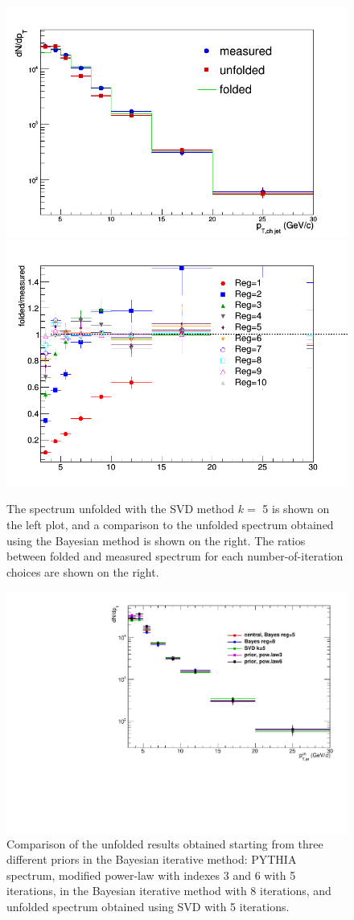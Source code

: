 \begin{figure}[bth]
\centering
\includegraphics[width=.45\textwidth]{pPbplots/unfolding/PythiaRM__Djet5Excl_SVD5_weight_UnfSpectrum}
\includegraphics[width=.45\textwidth]{pPbplots/unfolding/PythiaRM__Djet5Excl_SVD5_weight_foldedRatio}
\caption{The spectrum unfolded with the SVD method $k=$ 5 is shown on the left plot, and a comparison to the unfolded spectrum obtained using the Bayesian method is shown on the right.
The ratios between folded and measured spectrum for each number-of-iteration choices are shown on the right.}
\label{fig:unfSVDReg_pPb}
\end{figure}


\begin{figure}[bth]
\centering
\includegraphics[width=.45\textwidth]{pPbplots/unfolding/jetSpectra_unfSys}
\caption{Comparison of the unfolded results obtained starting from three different priors in the Bayesian iterative method: PYTHIA spectrum, modified power-law with indexes $3$ and $6$ with 5 iterations, in the Bayesian iterative method with 8 iterations, and unfolded spectrum obtained using SVD with 5 iterations.}
\label{fig:unfcomparison}
\end{figure}

